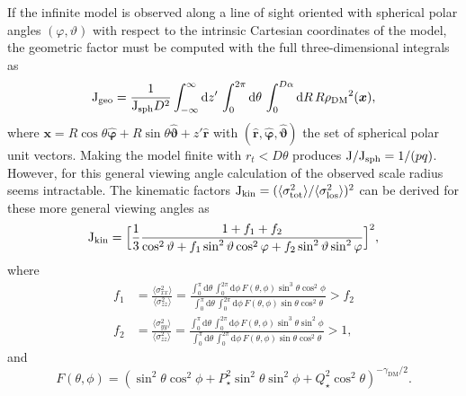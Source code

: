 \documentclass[prd,twocolumn,showpacs,preprintnumbers,superscriptaddress,nofootinbib,amsmath,amssymb,nobalancelastpage]{revtex4}
\def\sigmalos{\sigma_{\rm los}}
\def\rhoDM{{\rho_{\rm DM}}}
\def\rhoDM{{\rho_{\rm DM}}}
\newcommand{\Jf}{{\rm J}}
\begin{document}
If the infinite model is observed along a line of sight oriented with spherical polar angles $(\varphi,\vartheta)$ with respect to the intrinsic Cartesian coordinates of the model, the geometric factor must be computed with the full three-dimensional integrals as
\begin{equation}
\Jf_{\mathrm{geo}} = \frac{1}{\Jf_\mathrm{sph} D^2}\int_{-\infty}^{\infty}\mathrm{d}z'\,\int_{0}^{2\pi}\mathrm{d}\theta\,\int_{0}^{D\alpha}\mathrm{d}R\,R\rhoDM^2(\boldsymbol{x}),
\end{equation}
where
$
 \boldsymbol{x} = R\cos\theta \hat{\boldsymbol{\varphi}}+R\sin\theta\hat{\boldsymbol{\vartheta}}+z'\hat{\boldsymbol{r}}
$
with $(\hat{\boldsymbol{r}},\hat{\boldsymbol{\varphi}},\hat{\boldsymbol{\vartheta}})$ the set of spherical polar unit vectors. Making the model finite with $r_t<D\theta$ produces $\Jf/\Jf_{\rm sph}=1/(pq)$. However, for this general viewing angle calculation of the observed scale radius seems intractable. The kinematic factors $\Jf_\mathrm{kin} = (\langle\sigma_\mathrm{tot}^2\rangle/\langle\sigmalos^2\rangle)^2$ can be derived for these more general viewing angles as
\begin{equation}
\Jf_\mathrm{kin} = \Big[\frac{1}{3}\frac{1+f_1+f_2}{\cos^2\vartheta+f_1\sin^2\vartheta\cos^2\varphi +f_2\sin^2\vartheta\sin^2\varphi }\Big]^2,
\end{equation}
where
\begin{equation}
\begin{split}
f_1&=\frac{\langle\sigma_{xx}^2\rangle}{\langle\sigma_{zz}^2\rangle} =\frac{\int_0^\pi\mathrm{d}\theta\,\int_0^{2\pi}\mathrm{d}\phi\,F(\theta,\phi)\sin^3\theta\cos^2\phi }{\int_0^\pi\mathrm{d}\theta\,\int_0^{2\pi}\mathrm{d}\phi\,F(\theta,\phi)\sin\theta\cos^2\theta }>f_2\\
f_2&=\frac{\langle\sigma_{yy}^2\rangle}{\langle\sigma_{zz}^2\rangle} =\frac{\int_0^\pi\mathrm{d}\theta\,\int_0^{2\pi}\mathrm{d}\phi\,F(\theta,\phi) \sin^3\theta\sin^2\phi}{\int_0^\pi\mathrm{d}\theta\,\int_0^{2\pi}\mathrm{d}\phi\,F(\theta,\phi) \sin\theta\cos^2\theta}>1,
\end{split}
\end{equation}
and \begin{equation}
F(\theta,\phi) = (\sin^2\theta\cos^2\phi+P_\star^2\sin^2\theta\sin^2\phi+Q_\star^2\cos^2\theta)^{-\gamma_\mathrm{DM}/2}.
\end{equation}
\end{document}
